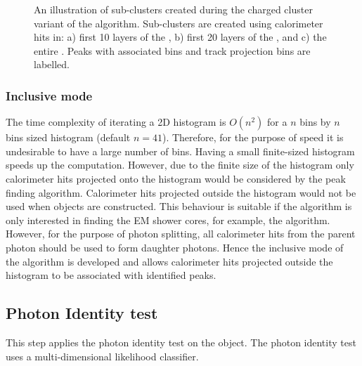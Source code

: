 \begin{figure}[tbph]
\begin{subfigure}[b]{0.65\textwidth}
    \caption{}
    \label{fig:photon2DpeakCharge3}
  \end{subfigure}
\caption
{An illustration of sub-clusters created during the charged cluster variant of the \peakFinding algorithm. Sub-clusters are created using calorimeter hits in: a) first 10 layers of the \ECAL, b) first 20 layers of the \ECAL, and c) the entire \ECAL. Peaks with associated bins and track projection bins are labelled.}
\label{fig:photon2DpeakCharge}
\end{figure}


\subsubsection{Inclusive mode}
\label{sec:photonPeakFindingInclusive}


The time complexity of iterating a 2D histogram is $O(n^2)$ for a $n$ bins by  $n$ bins sized histogram (default $n = 41$). Therefore, for the purpose of speed it is undesirable to have  a large number of bins. Having a small finite-sized histogram speeds up the computation. However, due to the finite size of the histogram only  calorimeter hits  projected onto the histogram would be considered by the peak finding algorithm. Calorimeter hits projected outside the histogram would not be used when \ShowerPeak objects are constructed. This behaviour is suitable if the algorithm is only interested in finding the EM shower cores, for example, the \PhotonReconstruction algorithm. However, for the purpose of photon splitting, all calorimeter hits from the parent photon should be used to form daughter photons. Hence the inclusive mode of the \peakFinding algorithm is developed and allows calorimeter hits projected outside the histogram to be associated with identified peaks.



\subsection{Photon Identity test}
\label{sec:photonIDtest}

This step applies the photon identity test on the \ShowerPeak object. The photon identity test uses  a multi-dimensional likelihood classifier.



